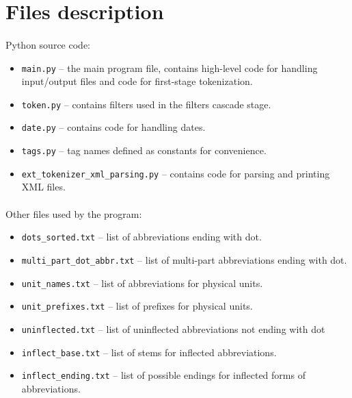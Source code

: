\documentclass[oneside,12pt]{article}
\begin{document}
\section{Files description}

\paragraph{}
Python source code:
\begin{itemize}
    \item \texttt{main.py} -- the main program file, contains high-level code for handling input/output files and code for first-stage tokenization.
    
    \item \texttt{token.py} -- contains filters used in the filters cascade stage.
    
    \item \texttt{date.py} -- contains code for handling dates.
    
    \item \texttt{tags.py} -- tag names defined as constants for convenience.
    
    \item \texttt{ext\_tokenizer\_xml\_parsing.py} -- contains code for parsing and printing XML files.
\end{itemize}

\paragraph{}
Other files used by the program:
\begin{itemize}
    \item \texttt{dots\_sorted.txt} -- list of abbreviations ending with dot.
    
    \item \texttt{multi\_part\_dot\_abbr.txt} -- list of multi-part abbreviations ending with dot.
    
    \item \texttt{unit\_names.txt} -- list of abbreviations for physical units.
    
    \item \texttt{unit\_prefixes.txt} -- list of prefixes for physical units.
    
    \item \texttt{uninflected.txt} -- list of uninflected abbreviations not ending with dot
    
    \item \texttt{inflect\_base.txt} -- list of stems for inflected abbreviations.
    
    \item \texttt{inflect\_ending.txt} -- list of possible endings for inflected forms of abbreviations.
\end{itemize}
\end{document}
